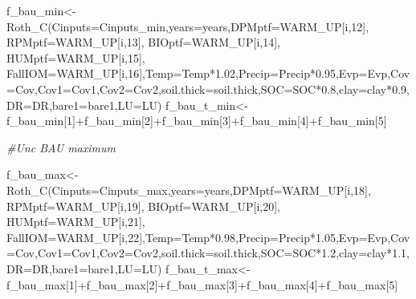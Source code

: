 \documentclass[
  10pt,
  b5paper,
]{book}
\newenvironment{Shaded}{\begin{snugshade}}{\end{snugshade}}
\newcommand{\AttributeTok}[1]{\textcolor[rgb]{0.77,0.63,0.00}{#1}}
\newcommand{\CommentTok}[1]{\textcolor[rgb]{0.56,0.35,0.01}{\textit{#1}}}
\newcommand{\DecValTok}[1]{\textcolor[rgb]{0.00,0.00,0.81}{#1}}
\newcommand{\FloatTok}[1]{\textcolor[rgb]{0.00,0.00,0.81}{#1}}
\newcommand{\FunctionTok}[1]{\textcolor[rgb]{0.00,0.00,0.00}{#1}}
\newcommand{\NormalTok}[1]{#1}
\newcommand{\OtherTok}[1]{\textcolor[rgb]{0.56,0.35,0.01}{#1}}
\newcommand{\SpecialCharTok}[1]{\textcolor[rgb]{0.00,0.00,0.00}{#1}}
\begin{document}
\begin{Shaded}
\begin{Highlighting}[]
\NormalTok{f\_bau\_min}\OtherTok{\textless{}{-}}\FunctionTok{Roth\_C}\NormalTok{(}\AttributeTok{Cinputs=}\NormalTok{Cinputs\_min,}\AttributeTok{years=}\NormalTok{years,}\AttributeTok{DPMptf=}\NormalTok{WARM\_UP[i,}\DecValTok{12}\NormalTok{], }\AttributeTok{RPMptf=}\NormalTok{WARM\_UP[i,}\DecValTok{13}\NormalTok{], }\AttributeTok{BIOptf=}\NormalTok{WARM\_UP[i,}\DecValTok{14}\NormalTok{], }\AttributeTok{HUMptf=}\NormalTok{WARM\_UP[i,}\DecValTok{15}\NormalTok{], }\AttributeTok{FallIOM=}\NormalTok{WARM\_UP[i,}\DecValTok{16}\NormalTok{],}\AttributeTok{Temp=}\NormalTok{Temp}\SpecialCharTok{*}\FloatTok{1.02}\NormalTok{,}\AttributeTok{Precip=}\NormalTok{Precip}\SpecialCharTok{*}\FloatTok{0.95}\NormalTok{,}\AttributeTok{Evp=}\NormalTok{Evp,}\AttributeTok{Cov=}\NormalTok{Cov,}\AttributeTok{Cov1=}\NormalTok{Cov1,}\AttributeTok{Cov2=}\NormalTok{Cov2,}\AttributeTok{soil.thick=}\NormalTok{soil.thick,}\AttributeTok{SOC=}\NormalTok{SOC}\SpecialCharTok{*}\FloatTok{0.8}\NormalTok{,}\AttributeTok{clay=}\NormalTok{clay}\SpecialCharTok{*}\FloatTok{0.9}\NormalTok{,}\AttributeTok{DR=}\NormalTok{DR,}\AttributeTok{bare1=}\NormalTok{bare1,}\AttributeTok{LU=}\NormalTok{LU)}
\NormalTok{f\_bau\_t\_min}\OtherTok{\textless{}{-}}\NormalTok{f\_bau\_min[}\DecValTok{1}\NormalTok{]}\SpecialCharTok{+}\NormalTok{f\_bau\_min[}\DecValTok{2}\NormalTok{]}\SpecialCharTok{+}\NormalTok{f\_bau\_min[}\DecValTok{3}\NormalTok{]}\SpecialCharTok{+}\NormalTok{f\_bau\_min[}\DecValTok{4}\NormalTok{]}\SpecialCharTok{+}\NormalTok{f\_bau\_min[}\DecValTok{5}\NormalTok{]}

\CommentTok{\#Unc BAU maximum}

\NormalTok{f\_bau\_max}\OtherTok{\textless{}{-}}\FunctionTok{Roth\_C}\NormalTok{(}\AttributeTok{Cinputs=}\NormalTok{Cinputs\_max,}\AttributeTok{years=}\NormalTok{years,}\AttributeTok{DPMptf=}\NormalTok{WARM\_UP[i,}\DecValTok{18}\NormalTok{], }\AttributeTok{RPMptf=}\NormalTok{WARM\_UP[i,}\DecValTok{19}\NormalTok{], }\AttributeTok{BIOptf=}\NormalTok{WARM\_UP[i,}\DecValTok{20}\NormalTok{], }\AttributeTok{HUMptf=}\NormalTok{WARM\_UP[i,}\DecValTok{21}\NormalTok{], }\AttributeTok{FallIOM=}\NormalTok{WARM\_UP[i,}\DecValTok{22}\NormalTok{],}\AttributeTok{Temp=}\NormalTok{Temp}\SpecialCharTok{*}\FloatTok{0.98}\NormalTok{,}\AttributeTok{Precip=}\NormalTok{Precip}\SpecialCharTok{*}\FloatTok{1.05}\NormalTok{,}\AttributeTok{Evp=}\NormalTok{Evp,}\AttributeTok{Cov=}\NormalTok{Cov,}\AttributeTok{Cov1=}\NormalTok{Cov1,}\AttributeTok{Cov2=}\NormalTok{Cov2,}\AttributeTok{soil.thick=}\NormalTok{soil.thick,}\AttributeTok{SOC=}\NormalTok{SOC}\SpecialCharTok{*}\FloatTok{1.2}\NormalTok{,}\AttributeTok{clay=}\NormalTok{clay}\SpecialCharTok{*}\FloatTok{1.1}\NormalTok{,}\AttributeTok{DR=}\NormalTok{DR,}\AttributeTok{bare1=}\NormalTok{bare1,}\AttributeTok{LU=}\NormalTok{LU)}
\NormalTok{f\_bau\_t\_max}\OtherTok{\textless{}{-}}\NormalTok{f\_bau\_max[}\DecValTok{1}\NormalTok{]}\SpecialCharTok{+}\NormalTok{f\_bau\_max[}\DecValTok{2}\NormalTok{]}\SpecialCharTok{+}\NormalTok{f\_bau\_max[}\DecValTok{3}\NormalTok{]}\SpecialCharTok{+}\NormalTok{f\_bau\_max[}\DecValTok{4}\NormalTok{]}\SpecialCharTok{+}\NormalTok{f\_bau\_max[}\DecValTok{5}\NormalTok{]}


\end{Highlighting}
\end{Shaded}
\end{document}
